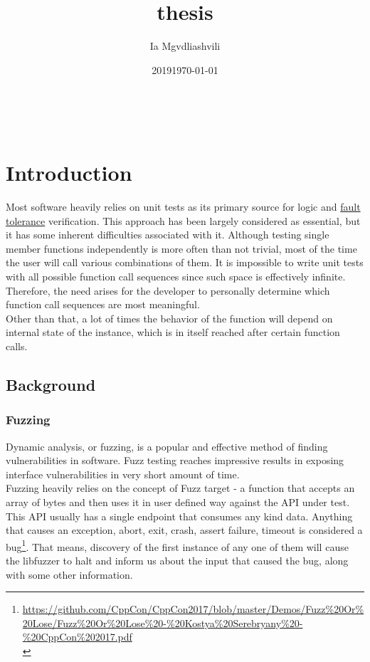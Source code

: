 \documentclass{elteikthesis}[2018/06/06]
\date{2019}
\affiliation{Associate Professor, PhD}
\author{Ia Mgvdliashvili}
\date{\today}
\title{thesis}
\begin{document}
\maketitle

\setcounter{page}{1} \\
\setcounter{tocdepth}{0}
\tableofcontents

\chapter{Introduction}
\label{sec-1}
Most software heavily relies on unit tests as its primary source for logic and \uline{fault tolerance} verification. This approach has been largely considered as essential, but it has some inherent difficulties associated with it. Although testing single member functions independently is more often than not trivial, most of the time the user will call various combinations of them. It is impossible to write unit tests with all possible function call sequences since such space is effectively infinite. Therefore, the need arises for the developer to personally determine which function call sequences are most meaningful. \\

Other than that, a lot of times the behavior of the function will depend on internal state of the instance, which is in itself reached after certain function calls. \\
\section{Background}
\label{sec-1-1}
\subsection{Fuzzing}
\label{sec-1-1-1}
Dynamic analysis, or fuzzing, is a popular and effective method of finding vulnerabilities in software. Fuzz testing reaches impressive results in exposing interface vulnerabilities in very short amount of time. \\

Fuzzing heavily relies on the concept of Fuzz target - a function that accepts an array of bytes and then uses it in user defined way against the API under test. This API usually has a single endpoint that consumes any kind data. Anything that causes an exception, abort, exit, crash, assert failure, timeout is considered a bug\footnote{\url{https://github.com/CppCon/CppCon2017/blob/master/Demos/Fuzz\%20Or\%20Lose/Fuzz\%20Or\%20Lose\%20-\%20Kostya\%20Serebryany\%20-\%20CppCon\%202017.pdf} \\}. That means, discovery of the first instance of any one of them will cause the libfuzzer to halt and inform us about the input that caused the bug, along with some other information. \\
\end{document}
